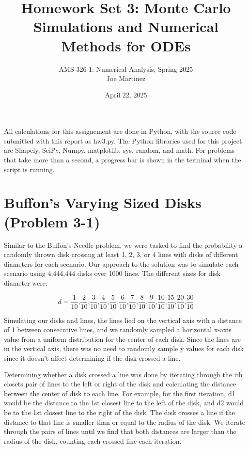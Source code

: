 \documentclass{article}
\title{Homework Set 3: Monte Carlo Simulations and Numerical Methods for ODEs}
\author{
AMS 326-1: Numerical Analysis, Spring 2025 \\
Joe Martinez
}
\date{April 22, 2025}
\begin{document}
\maketitle

All calculations for this assignement are done in Python, with the source code submitted with this report as hw3.py. The Python libraries used for this project are Shapely, SciPy, Numpy, matplotlib, sys, random, and math. For problems that take more than a second, a progress bar is shown in the terminal when the script is running.

\section{Buffon's Varying Sized Disks (Problem 3-1)}

Similar to the Buffon's Needle problem, we were tasked to find the probability a randomly thrown disk crossing at least 1, 2, 3, or 4 lines with disks of different diameters for each scenario. Our approach to the solution was to simulate each scenario using 4,444,444 disks over 1000 lines. The different sizes for disk diameter were:

\[ d = \frac{1}{10} \text{,} \frac{2}{10} \text{,} \frac{3}{10} \text{,} \frac{4}{10} \text{,} \frac{5}{10} \text{,} \frac{6}{10} \text{,} \frac{7}{10} \text{,} \frac{8}{10} \text{,} \frac{9}{10} \text{,} \frac{10}{10} \text{,} \frac{15}{10} \text{,} \frac{20}{10} \text{,}  \frac{30}{10} \]

Simulating our disks and lines, the lines lied on the vertical axis with a distance of 1 between consecutive lines, and we  randomly sampled a horizontal x-axis value from a uniform distribution for the center of each disk. Since the lines are in the vertical axis, there was no need to randomly sample y values for each disk since it doesn't affect determining if the disk crossed a line.

Determining whether a disk crossed a line was done by iterating through the ith closets pair of lines to the left or right of the disk and calculating the distance between the center of disk to each line. For example, for the first iteration, d1 would be the distance to the 1st closest line to the left of the disk, and d2 would be to the 1st closest line to the right of the disk. The disk crosses a line if the distance to that line is smaller than or equal to the radius of the disk. We iterate through the pairs of lines until we find that both distances are larger than the radius of the disk, counting each crossed line each iteration.
\end{document}
